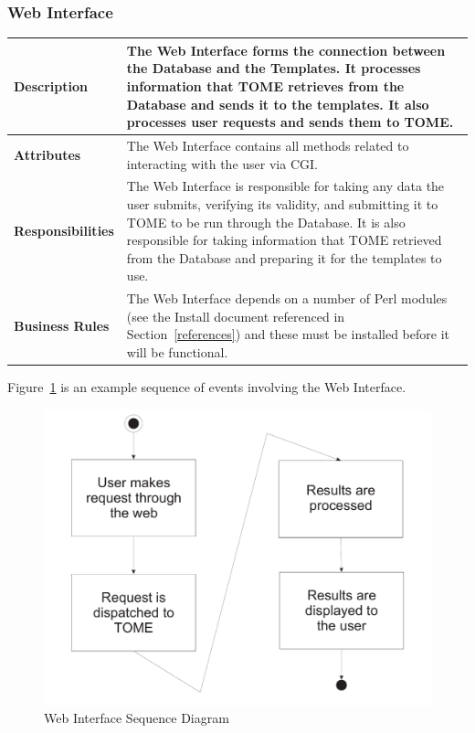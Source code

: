 \documentclass[12pt,titlepage]{article}
\begin{document}
\subsubsection{Web Interface}
\begin{longtable}{|p{}|p{}|}
	\hline
	\textbf{Description} & The Web Interface forms the connection between the Database and the Templates.  It processes information that TOME retrieves from the Database and sends it to the templates.  It also processes user requests and sends them to TOME.\\
	\hline
	\textbf{Attributes} & The Web Interface contains all methods related to interacting with the user via CGI.\\
	\hline
	\textbf{Responsibilities} & The Web Interface is responsible for taking any data the user submits, verifying its validity, and submitting it to TOME to be run through the Database.  It is also responsible for taking information that TOME retrieved from the Database and preparing it for the templates to use.\\
	\hline
	\textbf{Business Rules} & The Web Interface depends on a number of Perl modules (see the Install document referenced in Section~\ref{references}) and these must be installed before it will be functional.\\
	\hline
\end{longtable}
Figure~\ref{WebInterfaceSequenceDiagram} is an example sequence of events involving the Web Interface.
\begin{figure}[h]
	\centering
	\includegraphics[width=.5\textwidth]{WebInterfaceSequenceDiagram}
	\caption{Web Interface Sequence Diagram}
	\label{WebInterfaceSequenceDiagram}
\end{figure}
\end{document}
